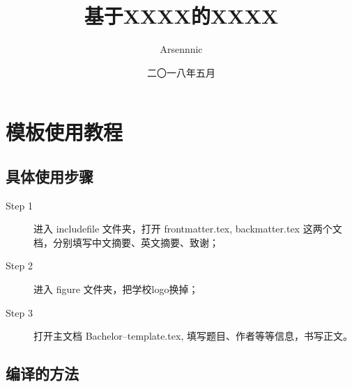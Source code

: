 \documentclass[forprint]{WHUBachelor}
\begin{document}
\ConfidentialLevel{}                                      %
\title{基于XXXX的XXXX}
\author{Arsennnic}                            %
\date{二〇一八年五月}                    %


\maketitle
\frontmatter
{}					%

\tableofcontents
\mainmatter


\chapter{模板使用教程}
 
 \section{具体使用步骤}

 \begin{description}

  \item[Step 1]  进入 includefile 文件夹，打开 frontmatter.tex, backmatter.tex 这两个文档，分别填写中文摘要、英文摘要、致谢；

  \item[Step 2]  进入 figure 文件夹，把学校logo换掉；

  \item[Step 3]  打开主文档 Bachelor--template.tex, 填写题目、作者等等信息，书写正文。


\end{description}


\section{编译的方法}\label{sec-compile}
\end{document}
